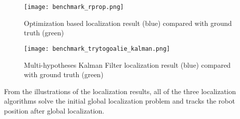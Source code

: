 
\begin{figure}[h!]
\begin{center}
	\texttt{[image: benchmark\_rprop.png]}
\end{center}
\caption{Optimization based localization result (blue) compared with ground truth (green)}
\label{fig:benchmarkRprop}
\end{figure}

\begin{figure}[h!]
\begin{center}
	\texttt{[image: benchmark\_trytogoalie\_kalman.png]}
\end{center}
\caption{Multi-hypotheses Kalman Filter localization result (blue) compared with ground truth (green)}
\label{fig:benchmarkKalman}
\end{figure}


From the illustrations of the localization results, all of the three localization algorithms solve the initial global localization problem and tracks the robot position after global localization. 

